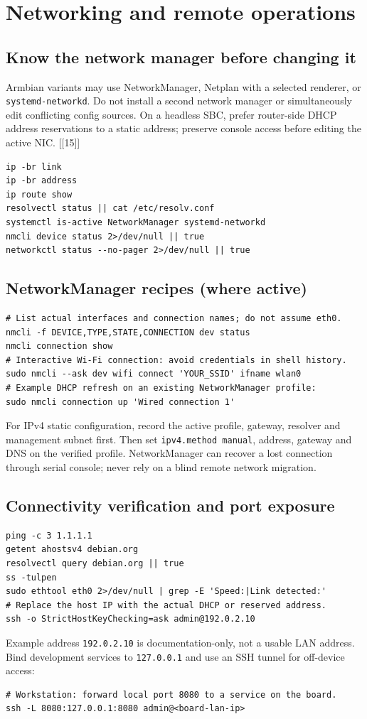 \documentclass[10pt,oneside,openany]{report}
\newcommand{\code}[1]{\texttt{#1}}
\newcommand{\smallref}[1]{{\sffamily\scriptsize\color{slate}[#1]}}
\begin{document}
\chapter{Networking and remote operations}
\section{Know the network manager before changing it}
Armbian variants may use NetworkManager, Netplan with a selected renderer, or \code{systemd-networkd}. Do not install a second network manager or simultaneously edit conflicting config sources. On a headless SBC, prefer router-side DHCP address reservations to a static address; preserve console access before editing the active NIC. \smallref{[15]}
\begin{lstlisting}[style=sh]
ip -br link
ip -br address
ip route show
resolvectl status || cat /etc/resolv.conf
systemctl is-active NetworkManager systemd-networkd
nmcli device status 2>/dev/null || true
networkctl status --no-pager 2>/dev/null || true
\end{lstlisting}
\section{NetworkManager recipes (where active)}
\begin{lstlisting}[style=sh]
# List actual interfaces and connection names; do not assume eth0.
nmcli -f DEVICE,TYPE,STATE,CONNECTION dev status
nmcli connection show
# Interactive Wi-Fi connection: avoid credentials in shell history.
sudo nmcli --ask dev wifi connect 'YOUR_SSID' ifname wlan0
# Example DHCP refresh on an existing NetworkManager profile:
sudo nmcli connection up 'Wired connection 1'
\end{lstlisting}
For IPv4 static configuration, record the active profile, gateway, resolver and management subnet first. Then set \code{ipv4.method manual}, address, gateway and DNS on the verified profile. NetworkManager can recover a lost connection through serial console; never rely on a blind remote network migration.
\section{Connectivity verification and port exposure}
\begin{lstlisting}[style=sh]
ping -c 3 1.1.1.1
getent ahostsv4 debian.org
resolvectl query debian.org || true
ss -tulpen
sudo ethtool eth0 2>/dev/null | grep -E 'Speed:|Link detected:'
# Replace the host IP with the actual DHCP or reserved address.
ssh -o StrictHostKeyChecking=ask admin@192.0.2.10
\end{lstlisting}
Example address \code{192.0.2.10} is documentation-only, not a usable LAN address. Bind development services to \code{127.0.0.1} and use an SSH tunnel for off-device access:
\begin{lstlisting}[style=sh]
# Workstation: forward local port 8080 to a service on the board.
ssh -L 8080:127.0.0.1:8080 admin@<board-lan-ip>
\end{lstlisting}
\end{document}
